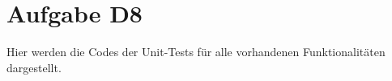 
\chapter{Aufgabe D8}
Hier werden die Codes der Unit-Tests für alle vorhandenen Funktionalitäten dargestellt.